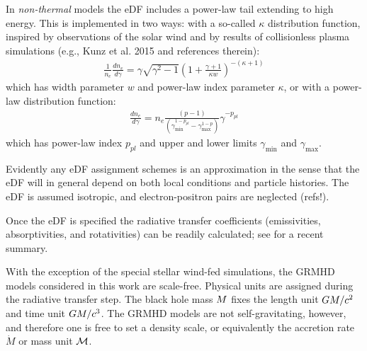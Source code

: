 In {\it non-thermal} models the eDF includes a power-law tail extending to high energy.
This is implemented in two ways: with a so-called $\kappa$ distribution function, inspired by observations of the solar wind and by results of
collisionless plasma simulations (e.g., Kunz et al. 2015 and references therein):
\begin{align}
  \frac{1}{n_e} \frac{d n_e}{d\gamma}= \gamma \sqrt{\gamma^2-1} \left(1+\frac{\gamma+1}{\kappa w}\right)^{-(\kappa+1)}
\end{align}
which has width parameter $w$ and power-law index parameter $\kappa$, or with a power-law distribution function:
\begin{align}
  \frac{d n_e}{d\gamma} =
  n_e \frac{ (p-1)}{(\gamma^{1-p_{pl}}_\mathrm{min} - \gamma^{1-p}_\mathrm{max})} \gamma^{-p_{pl}}
  \label{eq:nonthermaleDF}
\end{align}
which has power-law index $p_{pl}$ and upper and lower limits  $\gamma_{\min}$ and $\gamma_{\max}$.

Evidently any eDF assignment schemes is an approximation in the sense that the eDF will in general depend on both local conditions and particle histories.  The eDF is assumed isotropic, and electron-positron pairs are neglected (refs!).

Once the eDF is specified the radiative transfer coefficients (emissivities, absorptivities, and rotativities) can be readily calculated; see \cite{2021ApJ...921...17M} for a recent summary.



With the exception of the special stellar wind-fed simulations, the GRMHD models considered in this work are scale-free.  Physical units are assigned during the radiative transfer step.  The black hole mass $M$ fixes the length unit $GM/c^2$ and time unit $GM/c^3$.  The GRMHD models are not self-gravitating, however, and therefore one is free to set a density scale, or equivalently the accretion rate $\dot{M}$ or mass unit $\mathcal{M}$.

